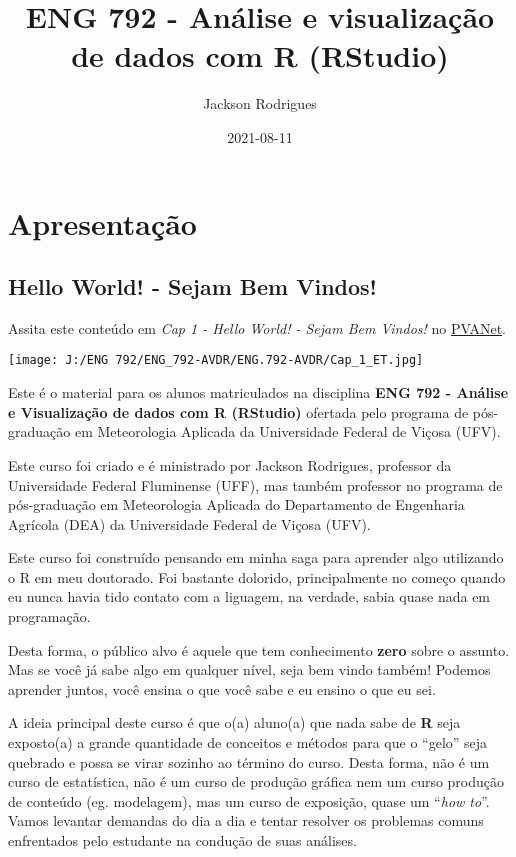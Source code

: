 \documentclass[
]{book}
\title{ENG 792 - Análise e visualização de dados com R (RStudio)}
\author{Jackson Rodrigues}
\date{2021-08-11}
\begin{document}
\maketitle

{
\setcounter{tocdepth}{1}
\tableofcontents
}
\hypertarget{apresentauxe7uxe3o}{%
\chapter{Apresentação}\label{apresentauxe7uxe3o}}

\hypertarget{hello-world---sejam-bem-vindos}{%
\section{Hello World! - Sejam Bem Vindos!}\label{hello-world---sejam-bem-vindos}}

Assita este conteúdo em \emph{Cap 1 - Hello World! - Sejam Bem Vindos!} no \href{https://www2.cead.ufv.br/sistemas/pvanet/geral/login.php}{PVANet}.

\texttt{[image: J:/ENG 792/ENG\_792-AVDR/ENG.792-AVDR/Cap\_1\_ET.jpg]}

Este é o material para os alunos matriculados na disciplina \textbf{ENG 792 - Análise e Visualização de dados com R (RStudio)} ofertada pelo programa de pós-graduação em Meteorologia Aplicada da Universidade Federal de Viçosa (UFV).

Este curso foi criado e é ministrado por Jackson Rodrigues, professor da Universidade Federal Fluminense (UFF), mas também professor no programa de pós-graduação em Meteorologia Aplicada do Departamento de Engenharia Agrícola (DEA) da Universidade Federal de Viçosa (UFV).

Este curso foi construído pensando em minha saga para aprender algo utilizando o R em meu doutorado. Foi bastante dolorido, principalmente no começo quando eu nunca havia tido contato com a liguagem, na verdade, sabia quase nada em programação.

Desta forma, o público alvo é aquele que tem conhecimento \textbf{zero} sobre o assunto. Mas se você já sabe algo em qualquer nível, seja bem vindo também! Podemos aprender juntos, você ensina o que você sabe e eu ensino o que eu sei.

A ideia principal deste curso é que o(a) aluno(a) que nada sabe de \textbf{R} seja exposto(a) a grande quantidade de conceitos e métodos para que o ``gelo'' seja quebrado e possa se virar sozinho ao término do curso. Desta forma, não é um curso de estatística, não é um curso de produção gráfica nem um curso produção de conteúdo (eg. modelagem), mas um curso de exposição, quase um ``\emph{how to}''. Vamos levantar demandas do dia a dia e tentar resolver os problemas comuns enfrentados pelo estudante na condução de suas análises.
\end{document}
